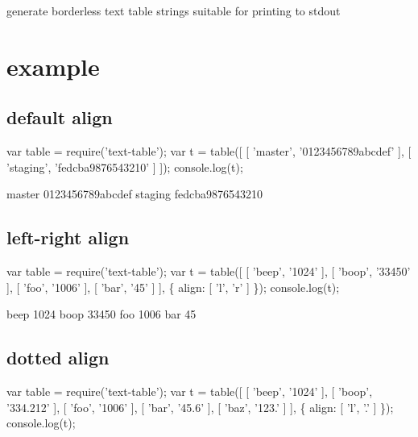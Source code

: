 generate borderless text table strings suitable for printing to stdout

\href{http://travis-ci.org/substack/text-table}{\tt }

\href{http://ci.testling.com/substack/text-table}{\tt }

\section*{example}

\subsection*{default align}


\begin{DoxyCode}
var table = require('text-table');
var t = table([
    [ 'master', '0123456789abcdef' ],
    [ 'staging', 'fedcba9876543210' ]
]);
console.log(t);
\end{DoxyCode}



\begin{DoxyCode}
master   0123456789abcdef
staging  fedcba9876543210
\end{DoxyCode}


\subsection*{left-\/right align}


\begin{DoxyCode}
var table = require('text-table');
var t = table([
    [ 'beep', '1024' ],
    [ 'boop', '33450' ],
    [ 'foo', '1006' ],
    [ 'bar', '45' ]
], \{ align: [ 'l', 'r' ] \});
console.log(t);
\end{DoxyCode}



\begin{DoxyCode}
beep   1024
boop  33450
foo    1006
bar      45
\end{DoxyCode}


\subsection*{dotted align}


\begin{DoxyCode}
var table = require('text-table');
var t = table([
    [ 'beep', '1024' ],
    [ 'boop', '334.212' ],
    [ 'foo', '1006' ],
    [ 'bar', '45.6' ],
    [ 'baz', '123.' ]
], \{ align: [ 'l', '.' ] \});
console.log(t);
\end{DoxyCode}



